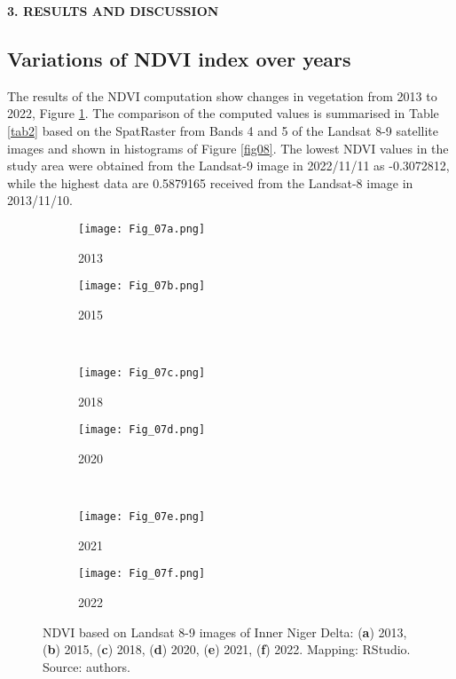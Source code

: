 \documentclass[12pt,a4paper,oneside]{article}
\def \newsection{\vspace{12pt}\textbf}
\def \newpar{\vspace{6pt}}
\begin{document}
\newsection {3. RESULTS AND DISCUSSION}

\subsection*{Variations of NDVI index over years}

\newpar The results of the NDVI computation show changes in vegetation from 2013 to 2022, Figure \ref{fig07}. The comparison of the computed values is summarised in Table \ref{tab2} based on the SpatRaster from Bands 4 and 5 of the Landsat 8-9 satellite images and shown in histograms of Figure \ref{fig08}. The lowest NDVI values in the study area were obtained from the Landsat-9 image in 2022/11/11 as -0.3072812, while the highest data are 0.5879165 received from the Landsat-8 image in 2013/11/10. 

\begin{figure}[H]
	\begin{subfigure}[b]{.5\textwidth}
		\centering
			\texttt{[image: Fig\_07a.png]}
		\caption{2013}
	\end{subfigure}%
	\begin{subfigure}[b]{.5\textwidth}
		\centering
		\texttt{[image: Fig\_07b.png]}
		\caption{2015}
	\end{subfigure}%
\\
\vfill \vspace{1mm}
	\begin{subfigure}[b]{.5\textwidth}
		\centering
			\texttt{[image: Fig\_07c.png]}
		\caption{2018}
	\end{subfigure}%
	\begin{subfigure}[b]{.5\textwidth}
		\centering
		\texttt{[image: Fig\_07d.png]}
		\caption{2020}
	\end{subfigure}%
\\
\vfill \vspace{1mm}
	\begin{subfigure}[b]{.5\textwidth}
		\centering
			\texttt{[image: Fig\_07e.png]}
		\caption{2021}
	\end{subfigure}%
	\begin{subfigure}[b]{.5\textwidth}
		\centering
		\texttt{[image: Fig\_07f.png]}
		\caption{2022}
	\end{subfigure}%
\vspace*{20pt}\caption{NDVI based on Landsat 8-9 images of Inner Niger Delta: (\textbf{a}) 2013, (\textbf{b}) 2015, (\textbf{c}) 2018, (\textbf{d}) 2020, (\textbf{e}) 2021, (\textbf{f}) 2022. Mapping: RStudio. Source: authors.}\label{fig07}
\end{figure}
\end{document}
